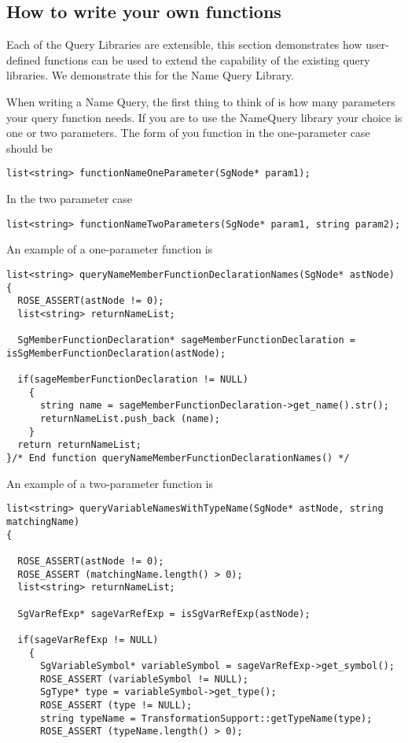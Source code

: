 {\subsection{How to write your own functions}

Each of the Query Libraries are extensible, this section demonstrates
how user-defined functions can be used to extend the capability of the
existing query libraries.  We demonstrate this for the Name Query Library.

When writing a Name Query, the first thing to think of is how many
parameters your query function needs. If you are to use the NameQuery
library your choice is one or two parameters. The form of you function
in the one-parameter case should be
\begin{verbatim}
list<string> functionNameOneParameter(SgNode* param1);
\end{verbatim}
In the two parameter case
\begin{verbatim}
list<string> functionNameTwoParameters(SgNode* param1, string param2);
\end{verbatim}
An example of a one-parameter function is
\begin{verbatim}
list<string> queryNameMemberFunctionDeclarationNames(SgNode* astNode)
{
  ROSE_ASSERT(astNode != 0);
  list<string> returnNameList;

  SgMemberFunctionDeclaration* sageMemberFunctionDeclaration = isSgMemberFunctionDeclaration(astNode);

  if(sageMemberFunctionDeclaration != NULL)
    {
      string name = sageMemberFunctionDeclaration->get_name().str();
      returnNameList.push_back (name);
    }
  return returnNameList;
}/* End function queryNameMemberFunctionDeclarationNames() */

\end{verbatim}
An example of a two-parameter function is
\begin{verbatim}
list<string> queryVariableNamesWithTypeName(SgNode* astNode, string matchingName)
{

  ROSE_ASSERT(astNode != 0);
  ROSE_ASSERT (matchingName.length() > 0);
  list<string> returnNameList;

  SgVarRefExp* sageVarRefExp = isSgVarRefExp(astNode);

  if(sageVarRefExp != NULL)
    {
      SgVariableSymbol* variableSymbol = sageVarRefExp->get_symbol();
      ROSE_ASSERT (variableSymbol != NULL);
      SgType* type = variableSymbol->get_type();
      ROSE_ASSERT (type != NULL);
      string typeName = TransformationSupport::getTypeName(type);
      ROSE_ASSERT (typeName.length() > 0);


\end{verbatim}}
